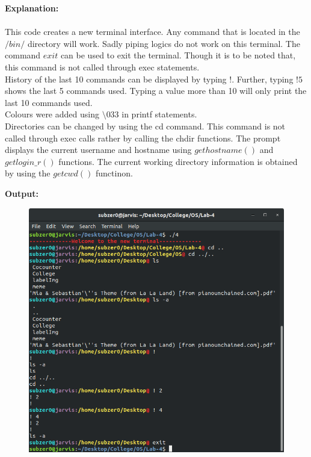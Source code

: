 \documentclass{article}
\begin{document}
\pagebreak
\bigskip
\noindent
\textbf{\Large Explanation: } \\
\bigskip
  \\This code creates a new terminal interface. Any command that is located in the
  $/bin/$ directory will work. Sadly piping logics do not work on this terminal. The 
  command $exit$ can be used to exit the terminal. Though it is to be noted that, 
  this command is not called through exec statements. \newline \\
  History of the last 10 commands can be displayed by typing $!$. Further, typing $! 5$
  shows the last 5 commands used. Typing a value more than 10 will only print the 
  last 10 commands used. \newline \\
  Colours were added using $\setminus 033$ in printf statements. \newline \\
  Directories can be changed by using the cd command. This command is not called
  through exec calls rather by calling the chdir functions. The prompt displays the
  current username and hostname using $gethostname()$ and $getlogin\_r()$ functions. The
  current working directory information is obtained by using the $getcwd()$ functinon.

\bigskip
\noindent
\textbf{\Large Output:}

\begin{figure}[h]
	\includegraphics[width=\textwidth]{output/4.png}
\end{figure}
\bigskip
\bigskip
\bigskip
\end{document}
